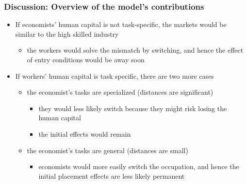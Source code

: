 \documentclass[11pt]{beamer}
\begin{document}
\begin{frame}
	\frametitle{Discussion: Overview of the model's contributions}
	\begin{itemize}
		
		\item  If economists’ human capital is not task-specific, the markets would be similar to the high skilled industry
		\begin{itemize}
			\item  the workers would solve the mismatch by switching, and hence the effect of entry conditions would be away soon
		\end{itemize}
		\vspace{1 mm}
		
			\item If workers' human capital is task specific, there are two more cases
		\begin{itemize}
			\item the economist’s tasks are specialized (distances  are significant)
			\begin{itemize}
				\item they would less likely switch because they might risk losing the human capital 
				\item the initial effects would remain 
			\end{itemize}
		\vspace{1 mm}
			\item the economist’s tasks are general (distances are small)
			\begin{itemize}
				\item  economists would more easily switch the occupation, and hence the initial placement effects are less likely permanent
			\end{itemize}
		\end{itemize}

	\end{itemize}
\end{frame}
\end{document}
